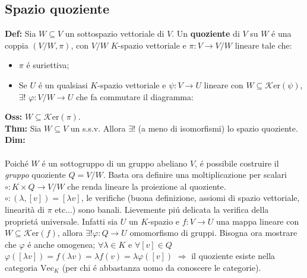 \documentclass[a4paper,11pt]{article}
\newcommand{\cart}{\times}
\newcommand{\Ker}{\mathcal{K}\mbox{er} }
\newcommand{\function}[3]{#1:#2 \rightarrow #3}
\newcommand{\thm}{\vskip 0.05cm \noindent \textbf{Thm:} }
\newcommand{\proof}{\vskip 0.05cm \noindent \textbf{Dim:} }
\newcommand{\definition}{\vskip 0.05cm \noindent \textbf{Def:} }
\newcommand{\oss}{\vskip 0.05cm \noindent \textbf{Oss:} }
\newcommand{\existence}{\framebox[\width]{ $\exists$ }}
\newcommand{\uniqueness}{\framebox[\width]{ ! }}
\begin{document}
\subsection{Spazio quoziente}
\definition Sia $W\subseteq V$ un sottospazio vettoriale di $V$. Un {\bf quoziente} di $V$ su $W$ \'e una coppia $(V/W,\pi)$, con $V/W$ $K$-spazio vettoriale e $\function{\pi}{V}{V/W}$ lineare tale che:
\begin{itemize}
\item $\pi$ \'e suriettiva;
\item Se $U$ \'e un qualsiasi $K$-spazio vettoriale e $\function{\psi}{V}{U}$ lineare con $W\subseteq \Ker(\psi)$, $\exists !$ $\function{\varphi}{V/W}{U}$ che fa commutare il diagramma:
\begin{center}
\end{center}
\end{itemize}
\oss $W\subseteq\Ker(\pi)$.\\
\thm Sia $W\subseteq V$ un s.s.v. Allora $\exists !$ (a meno di isomorfismi) lo spazio quoziente.
\proof \\
\existence \\
Poich\'e $W$ \'e un sottogruppo di un gruppo abeliano $V$, \'e possibile costruire il {\it gruppo} quoziente $ Q=V/W $. Basta ora definire una moltiplicazione per scalari $ \function{\circ}{K\cart Q}{V/W}$ che renda lineare la proiezione al quoziente. $\circ : (\lambda , [v]) = [\lambda v]$, le verifiche (buona definizione, assiomi di spazio vettoriale, linearità di $\pi$ etc...) sono banali. Lievemente pi\'u delicata la verifica della propriet\'a universale. Infatti sia $U$ un $K$-spazio e $\function{f}{V}{U}$ una mappa lineare con $W\subseteq\Ker(f)$, allora $\exists ! \function{\varphi}{Q}{U}$ omomorfismo di gruppi. Bisogna ora mostrare che $\varphi$ \'e anche omogenea; $\forall \lambda \in K$ e $\forall [v] \in Q$ $\varphi([\lambda v])= f(\lambda v)=\lambda f(v)= \lambda\varphi([v])$  $\Rightarrow$ il quoziente esiste nella categoria $\mbox{Vec}_{K}$ (per chi \'e abbastanza uomo da conoscere le categorie).\\
\uniqueness \\
\end{document}
